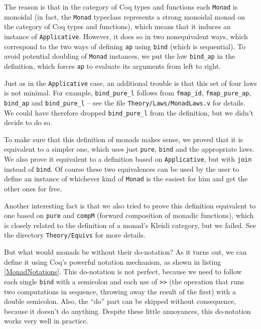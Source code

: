 \documentclass[declaration,inz,english,shortabstract]{iithesis}
\newcommand{\m}[1]{\texttt{#1}}
\begin{document}
The reason is that in the category of Coq types and functions each \m{Monad} is monoidal (in fact, the \m{Monad} typeclass represents a strong monoidal monad on the category of Coq types and functions), which means that it induces an instance of \m{Applicative}. However, it does so in two nonequivalent ways, which correspond to the two ways of defining \m{ap} using \m{bind} (which is sequential). To avoid potential doubling of \m{Monad} instances, we put the law \m{bind\_ap} in the definition, which forces \m{ap} to evaluate its arguments from left to right.

Just as in the \m{Applicative} case, an additional trouble is that this set of four laws is not minimal. For example, \m{bind\_pure\_l} follows from \m{fmap\_id}, \m{fmap\_pure\_ap}, \m{bind\_ap} and \m{bind\_pure\_l} -- see the file \m{Theory/Laws/MonadLaws.v} for details. We could have therefore dropped \m{bind\_pure\_l} from the definition, but we didn't decide to do so.

To make sure that this definition of monads makes sense, we proved that it is equivalent to a simpler one, which uses just \m{pure}, \m{bind} and the appropriate laws. We also prove it equivalent to a definition based on \m{Applicative}, but with \m{join} instead of \m{bind}. Of course these two equivalences can be used by the user to define an instance of whichever kind of \m{Monad} is the easiest for him and get the other ones for free.

Another interesting fact is that we also tried to prove this definition equivalent to one based on \m{pure} and \m{compM} (forward composition of monadic functions), which is closely related to the definition of a monad's Kleisli category, but we failed. See the directory \m{Theory/Equivs} for more details.


But what would monads be without their do-notation? As it turns out, we can define it using Coq's powerful notation mechanism, as shown in listing \ref{MonadNotations}. This do-notation is not perfect, because we need to follow each single \m{bind} with a semicolon and each use of \m{>>} (the operation that runs two computations in sequence, throwing away the result of the first) with a double semicolon. Also, the ``do'' part can be skipped without consequence, because it doesn't do anything. Despite these little annoyances, this do-notation works very well in practice.
\end{document}
